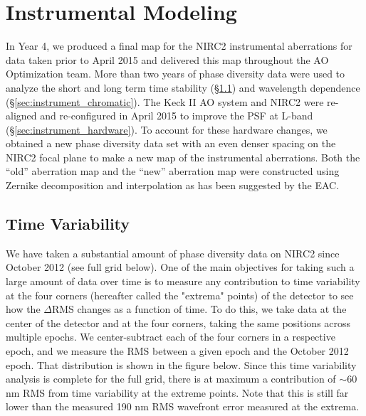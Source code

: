 \section{Instrumental Modeling}
\label{sec:instrument}

In Year 4, we produced a final map for the NIRC2 instrumental
aberrations for data taken prior to April 2015 and delivered this map
throughout the AO Optimization team. More than two years of
phase diversity data were used to analyze the short and long term time
stability (\S\ref{sec:instrument_time}) and wavelength dependence 
(\S\ref{sec:instrument_chromatic}). 
The Keck \textrm{II} AO system and NIRC2 were re-aligned and
re-configured in April 2015 to improve the PSF at L-band
(\S\ref{sec:instrument_hardware}). To account for these hardware changes, we 
obtained a new phase diversity data set with an even denser spacing on
the NIRC2 focal plane to make a new map of the instrumental
aberrations.
Both the ``old'' aberration map and the ``new'' aberration map were
constructed using Zernike decomposition and interpolation as has been
suggested by the EAC.

\subsection{Time Variability}
\label{sec:instrument_time}
We have taken a substantial amount of phase diversity data on NIRC2
since October 2012 (see full grid below). One of the main objectives
for taking such a large amount of data over time is to measure any
contribution to time variability at the four corners (hereafter called
the "extrema" points) of the detector to see how the $\Delta$RMS
changes as a function of time. To do this, we take data at the center
of the detector and at the four corners, taking the same positions
across multiple epochs. We center-subtract each of the four corners in
a respective epoch, and we measure the RMS between a given epoch and
the October 2012 epoch. That distribution is shown in the figure
below. Since this time variability analysis is complete for the full grid, there is at maximum a contribution of $\sim$60 nm RMS from time variability at the extreme points. Note that this is still far lower than the measured 190 nm RMS wavefront error measured at the extrema.

    
    
    
    
    
  
  
  
  